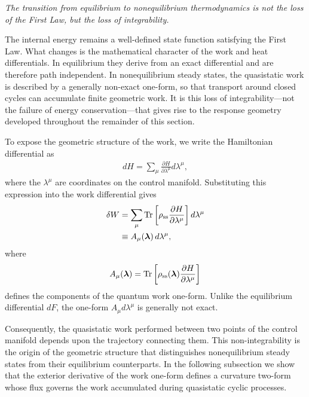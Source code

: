 \begin{tcolorbox}[
enhanced,
colback=gray!8,
colframe=black,
boxrule=0.8pt,
arc=2mm,
left=2mm,
right=2mm,
top=1.5mm,
bottom=1.5mm]
\centering
\itshape
The transition from equilibrium to nonequilibrium
thermodynamics is not the loss of the First Law,
but the loss of integrability.
\end{tcolorbox}

The internal energy remains a well-defined state function satisfying the First Law. What changes is the mathematical character of the work and heat differentials. In equilibrium they derive from an exact differential and are therefore path independent. In nonequilibrium steady states, the quasistatic work is described by a generally non-exact one-form, so that transport around closed cycles can accumulate finite geometric work. It is this loss of integrability—not the failure of energy conservation—that gives rise to the response geometry developed throughout the remainder of this section.

To expose the geometric structure of the work, we write the
Hamiltonian differential as
\begin{align}
dH
=
\sum_\mu
\frac{\partial H}
{\partial\lambda^\mu}
d\lambda^\mu,
\end{align}
where the \(\lambda^\mu\) are coordinates on the control
manifold. Substituting this expression into the work differential
gives
\begin{align}
\delta W
&=
\sum_\mu
\mathrm{Tr}
\left[
\rho_{\rm ss}
\frac{\partial H}
{\partial\lambda^\mu}
\right]
d\lambda^\mu
\\
&\equiv
A_\mu(\bm{\lambda})
\,d\lambda^\mu,
\end{align}
where
\begin{align}
A_\mu(\bm{\lambda})
=
\mathrm{Tr}
\left[
\rho_{\rm ss}(\bm{\lambda})
\frac{\partial H}
{\partial\lambda^\mu}
\right]
\end{align}
defines the components of the quantum work one-form.
Unlike the equilibrium differential \(dF\), the one-form
\(A_\mu d\lambda^\mu\) is generally not exact. 

Consequently, the
quasistatic work performed between two points of the control
manifold depends upon the trajectory connecting them. This
non-integrability is the origin of the geometric structure that
distinguishes nonequilibrium steady states from their equilibrium
counterparts. In the following subsection we show that the
exterior derivative of the work one-form defines a curvature
two-form whose flux governs the work accumulated during
quasistatic cyclic processes.



